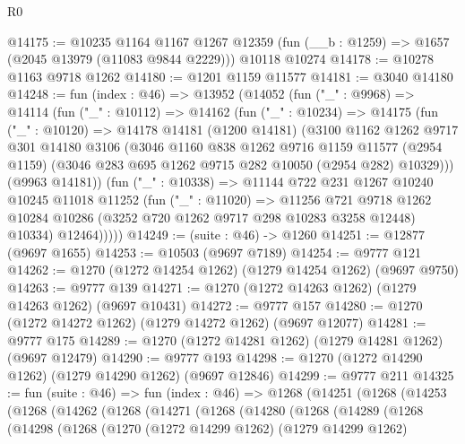 \begin{lexlean}{R0}
\begin{coremodule}
@14175 := @10235
    @1164
    @1167
    @1267
    @12359
    (fun (__b : @1259) => @1657 (@2045 @13979 (@11083 @9844 @2229)))
    @10118
    @10274
@14178 := @10278 @1163 @9718 @1262
@14180 := @1201 @1159 @11577
@14181 := @3040 @14180
@14248 := fun (index : @46) =>
  @13952
    (@14052
      (fun ("_" : @9968) =>
      @14114
        (fun ("_" : @10112) =>
        @14162
          (fun ("_" : @10234) =>
          @14175
            (fun ("_" : @10120) =>
            @14178
              @14181
              (@1200 @14181)
              (@3100
                @1162
                @1262
                @9717
                @301
                @14180
                @3106
                (@3046
                  @1160
                  @838
                  @1262
                  @9716
                  @1159
                  @11577
                  (@2954 @1159)
                  (@3046 @283 @695 @1262 @9715 @282 @10050 (@2954 @282) @10329)))
              (@9963 @14181))
            (fun ("_" : @10338) =>
            @11144
              @722
              @231
              @1267
              @10240
              @10245
              @11018
              @11252
              (fun ("_" : @11020) =>
              @11256
                @721
                @9718
                @1262
                @10284
                @10286
                (@3252 @720 @1262 @9717 @298 @10283 @3258 @12448)
                @10334)
              @12464)))))
@14249 := (suite : @46) -> @1260
@14251 := @12877 (@9697 @1655)
@14253 := @10503 (@9697 @7189)
@14254 := @9777 @121
@14262 := @1270 (@1272 @14254 @1262) (@1279 @14254 @1262) (@9697 @9750)
@14263 := @9777 @139
@14271 := @1270 (@1272 @14263 @1262) (@1279 @14263 @1262) (@9697 @10431)
@14272 := @9777 @157
@14280 := @1270 (@1272 @14272 @1262) (@1279 @14272 @1262) (@9697 @12077)
@14281 := @9777 @175
@14289 := @1270 (@1272 @14281 @1262) (@1279 @14281 @1262) (@9697 @12479)
@14290 := @9777 @193
@14298 := @1270 (@1272 @14290 @1262) (@1279 @14290 @1262) (@9697 @12846)
@14299 := @9777 @211
@14325 := fun (suite : @46) =>
  fun (index : @46) =>
  @1268
    (@14251
      (@1268
        (@14253
          (@1268
            (@14262
              (@1268
                (@14271
                  (@1268
                    (@14280
                      (@1268
                        (@14289
                          (@1268
                            (@14298
                              (@1268
                                (@1270
                                  (@1272 @14299 @1262)
                                  (@1279 @14299 @1262)

\end{coremodule}
\end{lexlean}
